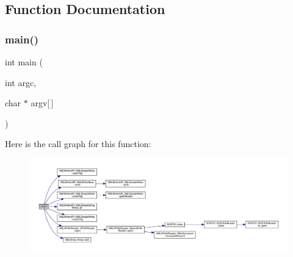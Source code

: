 \subsection{Function Documentation}
\mbox{\label{adat-devel_2other__libs_2xpath__reader_2examples_2simple__writer__test_8cc_a0ddf1224851353fc92bfbff6f499fa97}} 
\subsubsection{\texorpdfstring{main()}{main()}}
{\footnotesize\ttfamily int main (\begin{DoxyParamCaption}\item[{int}]{argc,  }\item[{char $\ast$}]{argv\mbox{[}$\,$\mbox{]} }\end{DoxyParamCaption})}

Here is the call graph for this function\+:
\nopagebreak
\begin{figure}[H]
\begin{center}
\leavevmode
\includegraphics[width=350pt]{d4/dc7/adat-devel_2other__libs_2xpath__reader_2examples_2simple__writer__test_8cc_a0ddf1224851353fc92bfbff6f499fa97_cgraph}
\end{center}
\end{figure}
